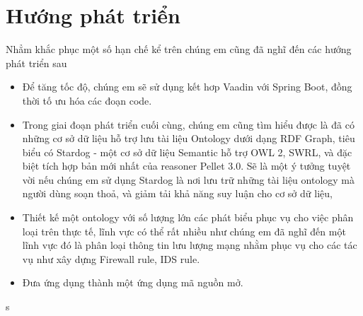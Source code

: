 \section{Hướng phát triển}
Nhẳm khắc phục một số hạn chế kể trên chúng em cũng đã nghĩ đến các hướng phát triển sau
\begin{itemize}
\item Để tăng tốc độ, chúng em sẽ sử dụng kết hơp Vaadin với Spring Boot, đồng thời tố ưu hóa các đoạn code.
\item Trong giai đoạn phát triển cuối cùng, chúng em cũng tìm hiểu được là đã có những cơ sở dữ liệu hỗ trợ lưu tài liệu Ontology dưới dạng RDF Graph, tiêu biểu có Stardog - một cơ sở dữ liệu Semantic hỗ trợ OWL 2, SWRL, và đặc biệt tích hợp bản mới nhất của reasoner Pellet 3.0. Sẽ là một ý tưởng tuyệt vời nếu chúng em sử dụng Stardog là nơi lưu trữ những tài liệu ontology mà người dùng soạn thoả, và giảm tải khả năng suy luận cho cơ sở dữ liệu,
\item Thiết kế một ontology với số lượng lớn các phát biểu phục vụ cho việc phân loại trên thực tế, lĩnh vực có thể rất nhiều như chúng em đã nghĩ đến một lĩnh vực đó là phân loại thông tin lưu lượng mạng nhằm phục vụ cho các tác vụ như xây dựng Firewall rule, IDS rule.
\item Đưa ứng dụng thành một ứng dụng mã nguồn mở.
\end{itemize}s






